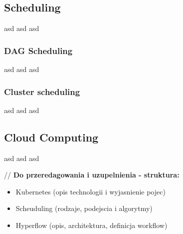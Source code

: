\subsection{Scheduling}
\label{section:Scheduling}

asd asd asd

\subsubsection{DAG Scheduling}

asd asd asd

\subsubsection{Cluster scheduling}

asd asd asd

\subsection{Cloud Computing}

asd asd asd



// \textbf{Do przeredagowania i uzupelnienia - struktura:}

\begin{itemize}
  \item Kubernetes (opis technologii i wyjasnienie pojec)
  \item Scheuduling (rodzaje, podejscia i algorytmy)
  \item Hyperflow (opis, architektura, definicja workflow)
\end{itemize}